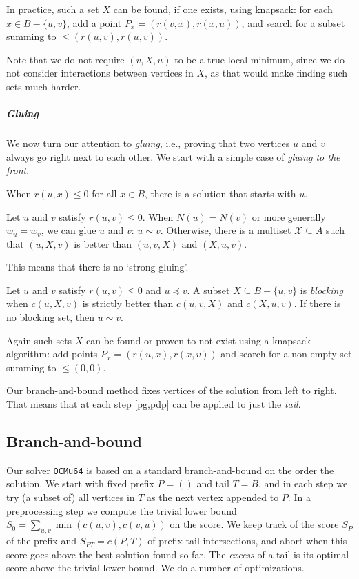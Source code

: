 \documentclass[a4paper,UKenglish,cleveref, autoref, thm-restate]{lipics-v2021}
\newcommand{\be}{\preceq}
\newcommand{\g}{\sim}
\newcommand{\w}{\overline{w}}
\begin{document}
In practice, such a set $X$ can be found, if one exists, using knapsack: for
each $x\in B-\{u,v\}$, add a point $P_x = (r(v, x), r(x, u))$, and search for a
subset summing to ${\leq{}(r(u, v), r(u, v))}$.

Note that we do not require $(v, X, u)$ to be a true local minimum, since we do
not consider interactions between vertices in $X$, as that would make finding
such sets much harder.

\subparagraph{Gluing}
We now turn our attention to \emph{gluing}, i.e., proving that two vertices $u$
and $v$ always go right next to each other. We start with a simple case of
\emph{gluing to the front}.

\begin{lemma}[Greedy]\label{greedy}
  When $r(u, x)\leq 0$ for all $x\in B$, there is a solution that
  starts with $u$.
\end{lemma}

\begin{remark}
  Let $u$ and $v$ satisfy $r(u,v) \leq 0$.
  When $N(u)=N(v)$ or more generally $\w_u=\w_v$, we can glue $u$ and $v$: $u\g v$.
  Otherwise, there is a multiset $\mathcal X\subseteq A$ such that $(u, X, v)$ is
  better than $(u,v,X)$ and $(X,u,v)$.
\end{remark}
This means that there is no `strong gluing'.
\begin{lemma}\label{pg}
  Let $u$ and $v$ satisfy $r(u,v)\leq 0$ and $u\be v$.
  A subset $X\subseteq B-\{u,v\}$ is \emph{blocking} when $c(u, X, v)$ is strictly
  better than $c(u,v,X)$ and $c(X,u,v)$.
  If there is no blocking set, then $u \g v$.
\end{lemma}
Again such sets $X$ can be found or proven to not exist using a knapsack
algorithm: add points $P_x = (r(u, x), r(x, v))$ and search for a non-empty
set summing to $\leq{}(0,0)$.

\begin{remark}
  Our branch-and-bound method fixes vertices of the
solution from left to right. That means that at each step \cref{pg,pdp} can be applied to
just the \emph{tail}.
\end{remark}

\subsection{Branch-and-bound}
Our solver \texttt{OCMu64} is based on a standard branch-and-bound on the order the solution.
We start with fixed prefix $P=()$ and tail $T=B$, and in each step we try (a
subset of) all vertices in $T$ as the next vertex appended to $P$.
In a preprocessing step we compute the trivial lower bound $S_0 =
\sum_{u,v}\min(c(u,v),c(v,u))$ on the score.
We keep track of the score $S_P$ of the prefix and $S_{PT}=c(P, T)$ of
prefix-tail intersections, and abort when this score goes above the best
solution found so far. The \emph{excess} of a tail is its optimal score above
the trivial lower bound. We do a number of optimizations.
\end{document}
